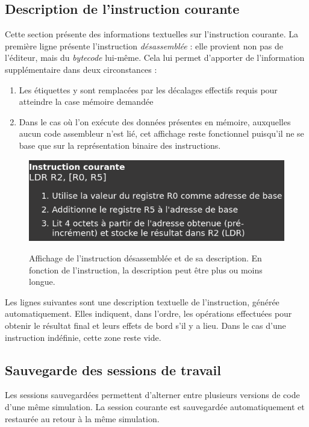 \documentclass{tufte-handout}
\begin{document}
\clearpage

\subsection{Description de l'instruction courante}

Cette section présente des informations textuelles sur l'instruction courante. La première ligne présente l'instruction \emph{désassemblée} : elle provient non pas de l'éditeur, mais du \textit{bytecode} lui-même. Cela lui permet d'apporter de l'information supplémentaire dans deux circonstances :
\begin{enumerate}
	\item Les étiquettes y sont remplacées par les décalages effectifs requis pour atteindre la case mémoire demandée
	\item Dans le cas où l'on exécute des données présentes en mémoire, auxquelles aucun code assembleur n'est lié, cet affichage reste fonctionnel puisqu'il ne se base que sur la représentation binaire des instructions.
\end{enumerate}
\begin{figure}[h!]
\raggedleft
\includegraphics[width=0.6\linewidth]{pics/disassembly.png}
\label{f:disassembly}
\caption{Affichage de l'instruction désassemblée et de sa description. En fonction de l'instruction, la description peut être plus ou moins longue.}
\end{figure}

Les lignes suivantes sont une description textuelle de l'instruction, générée automatiquement. Elles indiquent, dans l'ordre, les opérations effectuées pour obtenir le résultat final et leurs effets de bord s'il y a lieu. Dans le cas d'une instruction indéfinie, cette zone reste vide.


\clearpage
\subsection{Sauvegarde des sessions de travail}

Les sessions sauvegardées permettent d'alterner entre plusieurs versions de code d'une même simulation. La session courante est sauvegardée automatiquement et restaurée au retour à la même simulation. 
\end{document}
